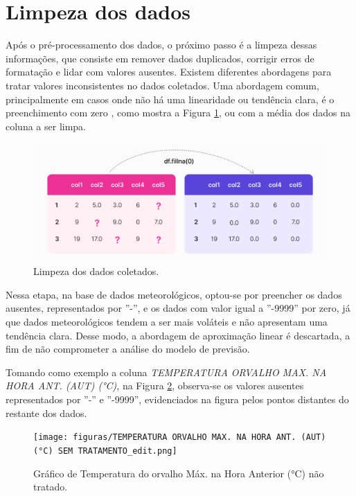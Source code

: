 \section{Limpeza dos dados}
\label{sec:limpeza_dos_dados}

Após o pré-processamento dos dados, o próximo passo é a limpeza dessas informações, que consiste em remover dados duplicados, corrigir erros de formatação e lidar com valores ausentes. Existem diferentes abordagens para tratar valores inconsistentes no dados coletados. Uma abordagem comum, principalmente em casos onde não há uma linearidade ou tendência clara, é o preenchimento com zero \cite{cousineau2010outliers}, como mostra a Figura \ref{fig:passo_dados_limpeza}, ou com a média dos dados na coluna a ser limpa.

\begin{figure}[H]
	\caption{\label{fig:passo_dados_limpeza}Limpeza dos dados coletados.}
	\begin{center}
		\includegraphics[scale=0.35]{figuras/step_data_cleaning.png}
	\end{center}
\end{figure}

Nessa etapa, na base de dados meteorológicos, optou-se por preencher os dados ausentes, representados por ''-'', e os dados com valor igual a ''-9999'' por zero, já que dados meteorológicos tendem a ser mais voláteis e não apresentam uma tendência clara. Desse modo, a abordagem de aproximação linear é descartada, a fim de não comprometer a análise do modelo de previsão.  

Tomando como exemplo a coluna \textit{TEMPERATURA ORVALHO MAX. NA HORA ANT. (AUT) (°C)}, na Figura \ref{fig:dados_clima_poa_nao_tratados}, observa-se os valores ausentes representados por ''-'' e ''-9999'', evidenciados na figura pelos pontos distantes do restante dos dados.

\begin{figure}[H]
	\caption{\label{fig:dados_clima_poa_nao_tratados}Gráfico de Temperatura do orvalho Máx. na Hora Anterior (°C) não tratado.}
	\begin{center}
		\texttt{[image: figuras/TEMPERATURA ORVALHO MAX. NA HORA ANT. (AUT) (°C) SEM TRATAMENTO\_edit.png]}
	\end{center}
\end{figure}

